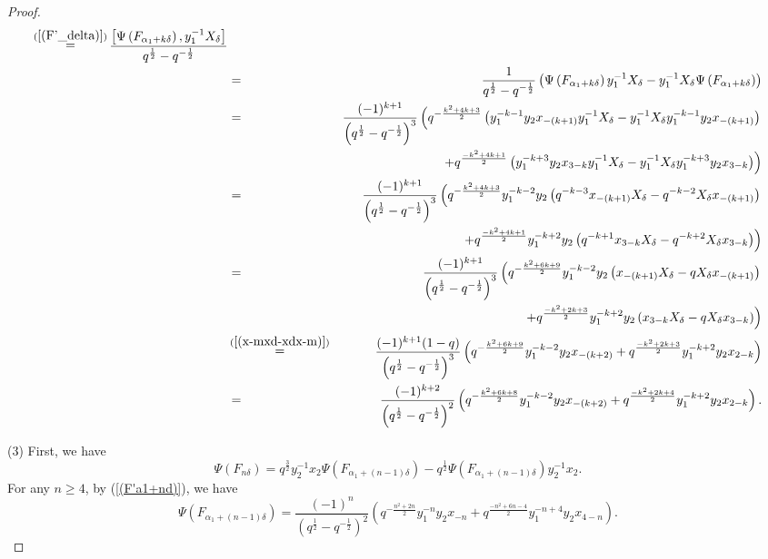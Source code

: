 \documentclass[reqno,11pt]{amsart}
\numberwithin{equation}{section}
\begin{document}
\begin{proof}
\begin{eqnarray*}
 \mathop  = \limits^{(\ref{(F'_delta)})} \frac{\left[\Psi\left(F_{\alpha_1+k \delta}\right), y_1^{-1} X_\delta\right]}{q^{\frac{1}{2}}-q^{-\frac{1}{2}}} \\
&	= & \frac{1}{q^{\frac{1}{2}}-q^{-\frac{1}{2}}}\left(\Psi\left(F_{\alpha_1+k \delta}\right) y_1^{-1} X_\delta-y_1^{-1} X_\delta \Psi\left(F_{\alpha_1+k \delta}\right)\right) \\
&	= & \frac{(-1)^{k+1}}{\left(q^{\frac{1}{2}}-q^{-\frac{1}{2}}\right)^3}\left(q^{-\frac{k^2+4 k+3}{2}}\left(y_1^{-k-1} y_2 x_{-(k+1)} y_1^{-1} X_\delta-y_1^{-1} X_\delta y_1^{-k-1} y_2 x_{-(k+1)}\right)\right. \\
	&& \left.+q^{\frac{-k^2+4 k+1}{2}}\left(y_1^{-k+3} y_2 x_{3-k} y_1^{-1} X_\delta-y_1^{-1} X_\delta y_1^{-k+3} y_2 x_{3-k}\right)\right) \\
&	= & \frac{(-1)^{k+1}}{\left(q^{\frac{1}{2}}-q^{-\frac{1}{2}}\right)^3}\left(q^{-\frac{k^2+4 k+3}{2}} y_1^{-k-2} y_2\left(q^{-k-3} x_{-(k+1)} X_\delta-q^{-k-2} X_\delta x_{-(k+1)}\right)\right. \\
&	& \left.+q^{\frac{-k^2+4 k+1}{2}} y_1^{-k+2} y_2\left(q^{-k+1} x_{3-k} X_\delta-q^{-k+2} X_\delta x_{3-k}\right)\right) \\
&	= & \frac{(-1)^{k+1}}{\left(q^{\frac{1}{2}}-q^{-\frac{1}{2}}\right)^3}\left(q^{-\frac{k^2+6 k+9}{2}} y_1^{-k-2} y_2\left(x_{-(k+1)} X_\delta-q X_\delta x_{-(k+1)}\right)\right. \\
&	& \left.+q^{\frac{-k^2+2 k+3}{2}} y_1^{-k+2} y_2\left(x_{3-k} X_\delta-q X_\delta x_{3-k}\right)\right)\\
	&  \mathop  = \limits^{(\ref{(x-mxd-xdx-m)})}&\frac{(-1)^{k+1}(1-q)}{\left(q^{\frac{1}{2}}-q^{-\frac{1}{2}}\right)^3}\left(q^{-\frac{k^2+6 k+9}{2}} y_1^{-k-2} y_2 x_{-(k+2)}+q^{\frac{-k^2+2 k+3}{2}} y_1^{-k+2} y_2 x_{2-k}\right) \\
& =&\frac{(-1)^{k+2}}{\left(q^{\frac{1}{2}}-q^{-\frac{1}{2}}\right)^2}\left(q^{-\frac{k^2+6 k+8}{2}} y_1^{-k-2} y_2 x_{-(k+2)}+q^{\frac{-k^2+2 k+4}{2}} y_1^{-k+2} y_2 x_{2-k}\right) .
\end{eqnarray*}
\endgroup

(3) First, we have
$$\Psi\left(F_{n \delta}\right)=q^{\frac{3}{2}} y_2^{-1} x_2 \Psi\left(F_{\alpha_1+(n-1) \delta}\right)-q^{\frac{1}{2}} \Psi\left(F_{\alpha_1+(n-1) \delta}\right) y_2^{-1} x_2 .$$
For any $n \ge 4$, by (\ref{(F'a1+nd)}), we have
$$\Psi\left(F_{\alpha_1+(n-1) \delta}\right)=\frac{(-1)^n}{\left(q^{\frac{1}{2}}-q^{-\frac{1}{2}}\right)^2}\left(q^{-\frac{n^2+2 n}{2}} y_1^{-n} y_2 x_{-n}+q^{\frac{-n^2+6 n-4}{2}} y_1^{-n+4} y_2 x_{4-n}\right) .$$


\end{proof}
\end{document}
